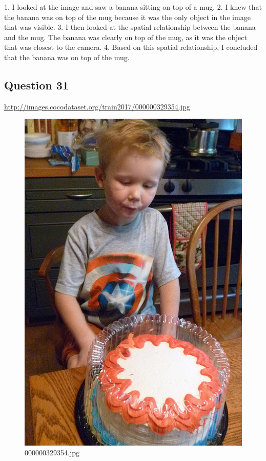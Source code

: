 \begin{enumerate}
        1. I looked at the image and saw a banana sitting on top of a mug.
        2. I knew that the banana was on top of the mug because it was the only object in the image that was visible.
        3. I then looked at the spatial relationship between the banana and the mug. The banana was clearly on top of the mug, as it was the object that was closest to the camera.
        4. Based on this spatial relationship, I concluded that the banana was on top of the mug.
    \end{enumerate}
\subsection*{Question 31}
\url{http://images.cocodataset.org/train2017/000000329354.jpg}
    \begin{figure}[h]
        \centering
        \includegraphics[width=0.8\linewidth]{../image set/easy/000000329354.jpg}
        \caption{000000329354.jpg}
    \end{figure}
